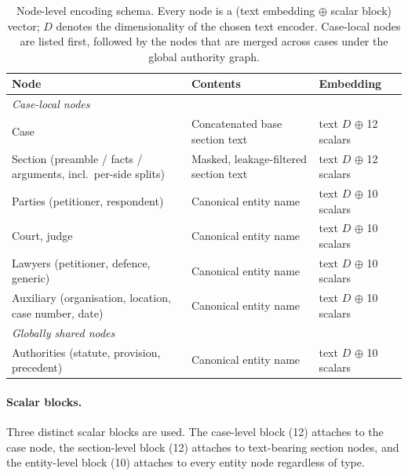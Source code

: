 \documentclass[runningheads]{llncs}
\begin{document}
\begin{table}[!htbp]
\centering
\caption{Node-level encoding schema. Every node is a (text embedding $\oplus$ scalar block) vector; $D$ denotes the dimensionality of the chosen text encoder. Case-local nodes are listed first, followed by the nodes that are merged across cases under the global authority graph.}
\label{tab:graph-encoding}
\setlength{\tabcolsep}{6pt}
\renewcommand{\arraystretch}{1.15}
\small
\begin{tabular}{p{3.4cm} p{4.6cm} p{3.4cm}}
\toprule
Node & Contents & Embedding \\
\midrule
\multicolumn{3}{l}{\textit{Case-local nodes}} \\
\midrule
Case & Concatenated base section text & text $D$ $\oplus$ 12 scalars \\
Section (preamble / facts / arguments, incl.\ per-side splits) & Masked, leakage-filtered section text & text $D$ $\oplus$ 12 scalars \\
Parties (petitioner, respondent) & Canonical entity name & text $D$ $\oplus$ 10 scalars \\
Court, judge & Canonical entity name & text $D$ $\oplus$ 10 scalars \\
Lawyers (petitioner, defence, generic) & Canonical entity name & text $D$ $\oplus$ 10 scalars \\
Auxiliary (organisation, location, case number, date) & Canonical entity name & text $D$ $\oplus$ 10 scalars \\
\midrule
\multicolumn{3}{l}{\textit{Globally shared nodes}} \\
\midrule
Authorities (statute, provision, precedent) & Canonical entity name & text $D$ $\oplus$ 10 scalars \\
\bottomrule
\end{tabular}
\end{table}

\paragraph{Scalar blocks.}
Three distinct scalar blocks are used. The case-level block (12) attaches to the case node, the section-level block (12) attaches to text-bearing section nodes, and the entity-level block (10) attaches to every entity node regardless of type.
\end{document}
